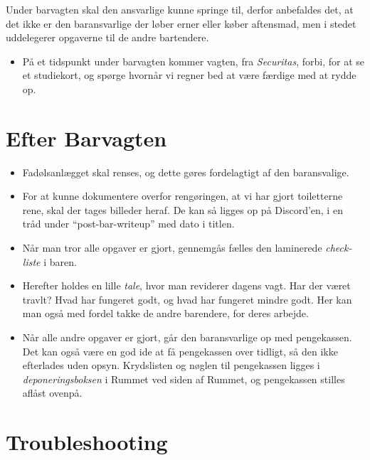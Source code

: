 Under barvagten skal den ansvarlige kunne springe til,
derfor anbefaldes det, at det ikke er den baransvarlige
der løber erner eller køber aftensmad, men i stedet uddelegerer
opgaverne til de andre bartendere.

\begin{itemize}
    \item På et tidspunkt under barvagten kommer vagten, fra \textit{Securitas}, forbi,
    for at se et studiekort, og spørge hvornår vi regner bed at være færdige med at rydde op.
\end{itemize}

\section{Efter Barvagten}
\label{sec:post-barvagten}

\begin{itemize}
    \item Fadølsanlægget skal renses, og dette gøres fordelagtigt af den baransvalige.
    \item For at kunne dokumentere overfor rengøringen, at vi har gjort toiletterne rene,
    skal der tages billeder heraf. De kan så ligges op på Discord'en, i en tråd under
    ``post-bar-writeup'' med dato i titlen.
    \item Når man tror alle opgaver er gjort, 
    gennemgås fælles den laminerede \textit{check-liste} i baren.
    \item Herefter holdes en lille \textit{tale}, hvor man reviderer dagens vagt. 
    Har der været travlt? Hvad har fungeret godt, og hvad har fungeret mindre godt.
    Her kan man også med fordel takke de andre barendere, for deres arbejde.
    \item Når alle andre opgaver er gjort, går den baransvarlige op med pengekassen.
    Det kan også være en god ide at få pengekassen over tidligt, så den ikke efterlades uden opsyn.
    Krydslisten og nøglen til pengekassen ligges i \textit{deponeringsboksen} 
    i Rummet ved siden af Rummet, og pengekassen stilles aflåst ovenpå. 
\end{itemize}

\newpage
\section{Troubleshooting}
\label{sec:troubleshooting}

